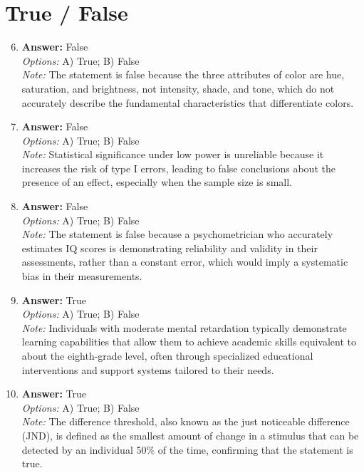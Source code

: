 \documentclass[12pt]{article}
\begin{document}
\section*{True / False}
\begin{enumerate}[label=\arabic*.]
\setcounter{enumi}{5}
\item \textbf{Answer:} False
\\ \textit{Options:} A) True; B) False
\\ \textit{Note:} The statement is false because the three attributes of color are hue, saturation, and brightness, not intensity, shade, and tone, which do not accurately describe the fundamental characteristics that differentiate colors.
\item \textbf{Answer:} False
\\ \textit{Options:} A) True; B) False
\\ \textit{Note:} Statistical significance under low power is unreliable because it increases the risk of type I errors, leading to false conclusions about the presence of an effect, especially when the sample size is small.
\item \textbf{Answer:} False
\\ \textit{Options:} A) True; B) False
\\ \textit{Note:} The statement is false because a psychometrician who accurately estimates IQ scores is demonstrating reliability and validity in their assessments, rather than a constant error, which would imply a systematic bias in their measurements.
\item \textbf{Answer:} True
\\ \textit{Options:} A) True; B) False
\\ \textit{Note:} Individuals with moderate mental retardation typically demonstrate learning capabilities that allow them to achieve academic skills equivalent to about the eighth-grade level, often through specialized educational interventions and support systems tailored to their needs.
\item \textbf{Answer:} True
\\ \textit{Options:} A) True; B) False
\\ \textit{Note:} The difference threshold, also known as the just noticeable difference (JND), is defined as the smallest amount of change in a stimulus that can be detected by an individual 50\% of the time, confirming that the statement is true.
\end{enumerate}
\end{document}
